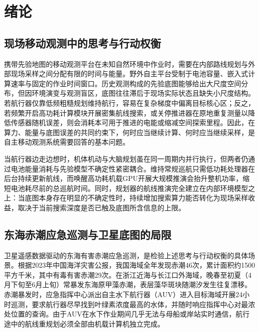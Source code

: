 \section{绪论}

\subsection{现场移动观测中的思考与行动权衡}

携带先验地图的移动观测平台在未知自然环境中作业时，需要在内部路线规划与外部现场采样之间分配有限的时间与能量\cite{horvitz1987reasoning, russell1991right, shen2025thinking}。野外自主平台受制于电池容量、嵌入式计算速率与固定的作业时间窗口\cite{xiao2020thinking, magnino2026metareasoning}。历史观测构成的先验底图能够给出大尺度空间分布，但因环境演变与观测盲区，底图往往滞后于现场实际状态且缺失小尺度结构\cite{fossum2019, beckers2003dineof}。若航行器仅靠低频粗糙规划维持航行，容易在复杂梯度中偏离目标核心区；反之，若频繁开启高功耗计算模块开展密集航线搜索，或关停推进器在原地重复测量以降低传感器随机误差，则会消耗本可用于推进的电能或缩减空间探索里程\cite{cuadron2025overthinking, elboher2023formal}。因此，在算力、能量与底图误差的共同约束下，何时应当继续计算、何时应当继续采样，是自主移动观测系统需要回答的基本问题\cite{hunt2021formalizing}。

当航行器边走边想时，机体机动与大脑规划虽在同一周期内并行执行，但两者仍通过电池能量消耗与先验模型不确定性紧密耦合\cite{xiao2020thinking, elboher2023formal}。维持常规巡航只需低功耗处理器在后台持续更新航线，而唤醒高功耗机载GPU开展大规模推演会抬升整机功率，缩短电池耗尽前的总巡航时间。同时，规划器的航线推演完全建立在内部环境模型之上：当底图本身存在明显的不确定性时，持续增加搜索算力能否转化为现场采样收益，取决于当前搜索深度是否已触及底图所含信息的上限\cite{jiang2015horizon, smith2006curse}。

\subsection{东海赤潮应急巡测与卫星底图的局限}

卫星遥感数据驱动的东海有害赤潮应急巡测，是检验上述思考与行动权衡的具体场景\cite{fossum2019, lou2014diurnal}。根据2023年中国海洋灾害公报，我国海域全年发现赤潮46次，累计面积约1500平方千米，其中有毒有害赤潮29次\cite{mnr2024bulletin}。在浙江近海与长江口外海域，晚春至初夏（4月下旬至6月上旬）常暴发东海原甲藻赤潮\cite{zhao2025distinguishing}，表层藻华斑块随潮汐发生往复漂移\cite{lou2014diurnal}。赤潮暴发时，应急指挥中心派出自主水下航行器（AUV）进入目标海域开展24小时巡测，要求航行器尽早找到叶绿素浓度最高的水体，并随时响应指挥中心对最浓处位置的查询\cite{fossum2019, remus100}。由于AUV在水下作业期间几乎无法与母船或岸站实时通信，航行途中的航线重规划必须全部由机载计算机独立完成。

